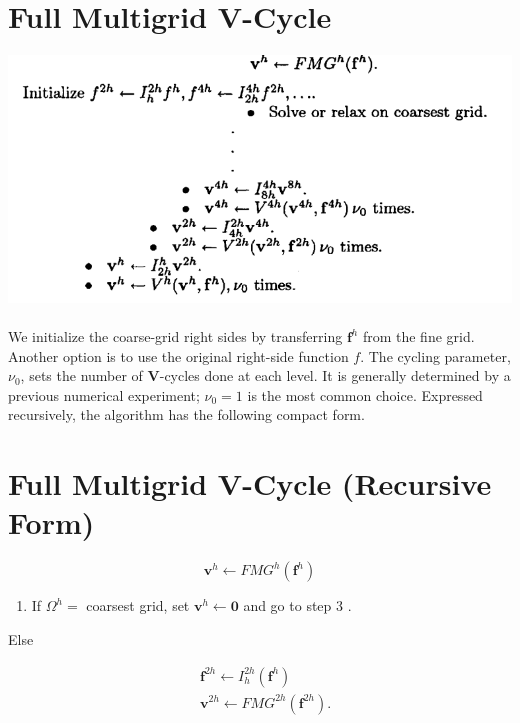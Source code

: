 \documentclass[11pt]{book}
\begin{document}
\section*{Full Multigrid V-Cycle}
\includegraphics[scale=0.6]{images/FMVC1.png} \\ \\
We initialize the coarse-grid right sides by transferring $\mathbf{f}^{h}$ from the fine grid. Another option is to use the original right-side function $f$. The cycling parameter, $\nu_{0}$, sets the number of $\mathbf{V}$-cycles done at each level. It is generally determined by a previous numerical experiment; $\nu_{0}=1$ is the most common choice. Expressed recursively, the algorithm has the following compact form.
\section*{Full Multigrid V-Cycle (Recursive Form)}
$$
\mathbf{v}^{h} \leftarrow F M G^{h}\left(\mathbf{f}^{h}\right)
$$

\begin{enumerate}
  \item If $\Omega^{h}=$ coarsest grid, set $\mathbf{v}^{h} \leftarrow \mathbf{0}$ and go to step 3 .
\end{enumerate}

Else

$$
\begin{aligned}
& \mathbf{f}^{2 h} \leftarrow I_{h}^{2 h}\left(\mathbf{f}^{h}\right) \\
& \mathbf{v}^{2 h} \leftarrow F M G^{2 h}\left(\mathbf{f}^{2 h}\right) .
\end{aligned}
$$
\end{document}
